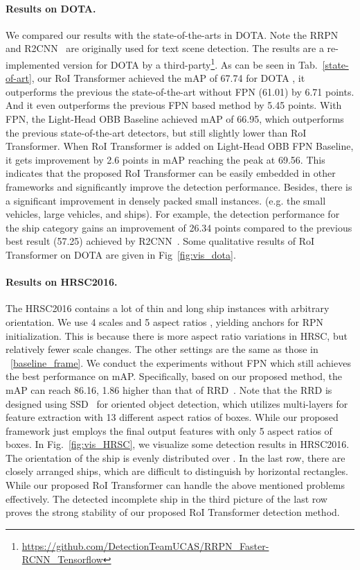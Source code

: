 \documentclass[11pt,onecolumn]{article}         \usepackage[top=3.6cm, bottom=3.2cm, left=2.3cm, right=2.3cm]{geometry}
\begin{document}
\paragraph{Results on DOTA.} We compared our results with the state-of-the-arts in DOTA. Note the RRPN~\cite{RRPN} and R2CNN~\cite{R2CNN} are originally used for text scene detection. The results are a re-implemented version for DOTA by a third-party\footnote{\url{https://github.com/DetectionTeamUCAS/RRPN_Faster-RCNN_Tensorflow}}. As can be seen in Tab.~\ref{state-of-art}, our RoI Transformer achieved the mAP of 67.74 for DOTA , it outperforms the previous the state-of-the-art without FPN (61.01) by 6.71 points. And it even outperforms the previous FPN based method by 5.45 points. With FPN, the Light-Head OBB Baseline achieved mAP of 66.95, which outperforms the previous state-of-the-art detectors, but still slightly lower than RoI Transformer. When RoI Transformer is added on Light-Head OBB FPN Baseline, it gets improvement by 2.6 points in mAP reaching the peak at 69.56. This indicates that the proposed RoI Transformer can be easily embedded in other frameworks and significantly improve the detection performance. Besides, there is a significant improvement in densely packed small instances. (e.g. the small vehicles, large vehicles, and ships). For example, the detection performance for the ship category gains an improvement of 26.34 points compared to the previous best result (57.25) achieved by R2CNN~\cite{R2CNN}. Some qualitative results of RoI Transformer on DOTA are given in Fig~\ref{fig:vis_dota}. 

\paragraph{Results on HRSC2016.} The HRSC2016 contains a lot of thin and long ship instances with arbitrary orientation. We use 4 scales  and 5 aspect ratios , yielding  anchors for RPN initialization. This is because there is more aspect ratio variations in HRSC, but relatively fewer scale changes. The other settings are the same as those in ~\ref{baseline_frame}.  We conduct the experiments without FPN which still achieves the best performance on mAP. Specifically, based on our proposed method, the mAP can reach 86.16, 1.86 higher than that of RRD~\cite{RRD}. Note that the RRD is designed using  SSD~\cite{SSD} for oriented object detection, which utilizes multi-layers for feature extraction with 13 different aspect ratios of boxes. While our proposed framework just employs the final output features with only 5 aspect ratios of boxes. In Fig.~\ref{fig:vis_HRSC}, we visualize some detection results in HRSC2016. The orientation of the ship is evenly distributed over . In the last row, there are closely arranged ships, which are difficult to distinguish by horizontal rectangles. While our proposed RoI Transformer can handle the above mentioned problems effectively. The detected  incomplete ship in the third picture of the last row proves the strong stability of our proposed RoI Transformer detection method.
\end{document}
